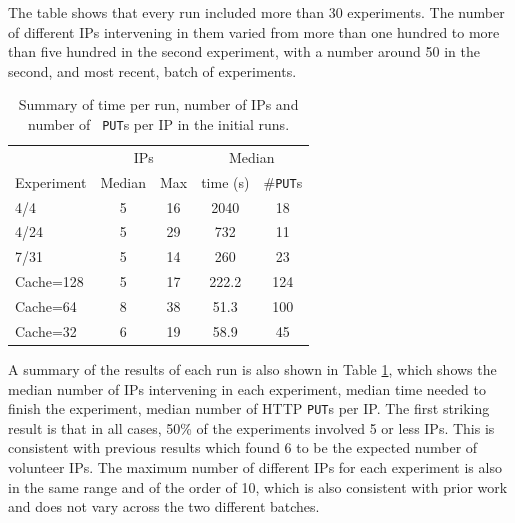 \documentclass[letterpaper]{article}
\begin{document}
The table shows that every run included more than 30 experiments. The
number of different IPs intervening in them varied from more than one
hundred to more than five hundred in the second experiment, with a
number around 50 in the second, and most recent, batch of experiments. 
%
\begin{table}[htb]
\caption{Summary of time per run, number of IPs and number of {\tt
    PUT}s per IP in the initial runs. \label{tab:summary:os}}
\begin{center}
\begin{tabular}{l|cccc}
\hline
     & \multicolumn{2}{c}{IPs} & \multicolumn{2}{c}{Median} \\
Experiment & Median & Max & time (s) &  \#{\tt  PUT}s \\
\hline
4/4 & 5 & 16 & 2040 & 18   \\
4/24 &  5 & 29 & 732 & 11  \\
7/31 & 5 & 14 & 260 & 23   \\
\hline
Cache=128 & 5 & 17 & 222.2 & 124 \\ 
Cache=64 & 8 & 38 & 51.3 & 100 \\
Cache=32 & 6 & 19 & 58.9 & 45 \\
\hline
\end{tabular}
\end{center}
\end{table}
%

A summary of the results of each run is also shown in Table
\ref{tab:summary:os}, which shows the median number of IPs
intervening in each experiment,  median time needed
to finish the experiment, median number of HTTP {\tt PUT}s per IP. The
first striking result is that in all cases, 50\% of the 
experiments involved 5 or less IPs. This is consistent with previous results
\citep{DBLP:conf/gecco/GuervosG15} which found 6 to be
the expected number of volunteer IPs. The
maximum number of different IPs for each experiment is also in the
same range and of the order of 10, which is also consistent with
prior work and does not vary across the two different batches. 
\end{document}
